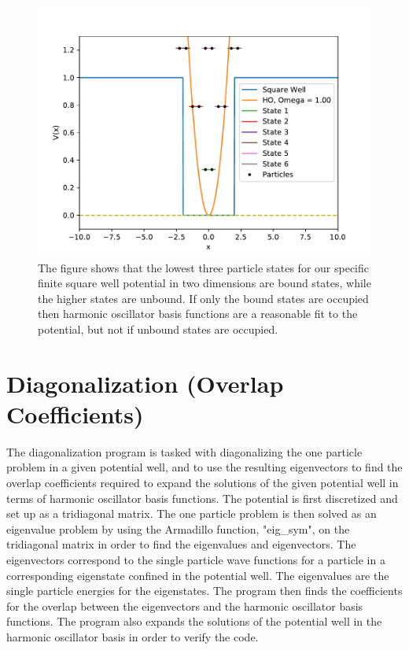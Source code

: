 \documentclass[../main.tex]{subfiles}
\begin{document}
\begin{figure}
\centering
\includegraphics[width=\linewidth]{figures/SW_Energy_Levels}
\caption{The figure shows that the lowest three particle states for our specific finite square well potential in two dimensions are bound states, while the higher states are unbound. If only the bound states are occupied then harmonic oscillator basis functions are a reasonable fit to the potential, but not if unbound states are occupied.}
\label{fig: FSW_energy_levels}
\end{figure}

\section{Diagonalization (Overlap Coefficients)}

The diagonalization program is tasked with diagonalizing the one particle problem in a given potential well, and to use the resulting eigenvectors to find the overlap coefficients required to expand the solutions of the given potential well in terms of harmonic oscillator basis functions. The potential is first discretized and set up as a tridiagonal matrix. The one particle problem is then solved as an eigenvalue problem by using the Armadillo\cite{Armadillo} function, "eig\_sym", on the tridiagonal matrix in order to find the eigenvalues and eigenvectors. The eigenvectors correspond to the single particle wave functions for a particle in a corresponding eigenstate confined in the potential well. The eigenvalues are the single particle energies for the eigenstates. The program then finds the coefficients for the overlap between the eigenvectors and the harmonic oscillator basis functions. The program also expands the solutions of the potential well in the harmonic oscillator basis in order to verify the code.
\end{document}
